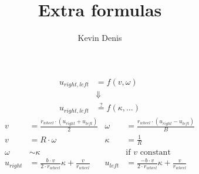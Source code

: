 \documentclass[12pt,a4paper]{article}
\author{Kevin Denis}
\title{Extra formulas}
\begin{document}
\begin{align*}
u_{right,left}&=f(v,\omega) \\
&\Downarrow\\
u_{right,left}&\stackrel{?}{=}f(\kappa, \dots)
\end{align*}
\begin{align*}
v &= \frac{r_{wheel}\cdot(u_{right} + u_{left})}{2} & \omega &= \frac{r_{wheel}\cdot(u_{right} - u_{left})}{B} \\
v & = R \cdot \omega & \kappa &= \frac{1}{R} \\
\omega & \sim \kappa & &\text{if $v$ constant}  \\
u_{right} & = \frac{b\cdot v}{2\cdot r_{wheel}} \kappa + \frac{v}{r_{wheel}} & u_{left} & = \frac{-b \cdot v}{2\cdot r_{wheel}} \kappa + \frac{v}{r_{wheel}} 
\end{align*}
\end{document}
